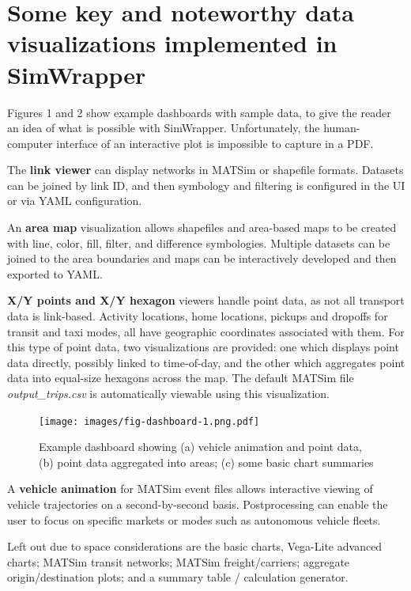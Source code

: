 \documentclass[3p,times,procedia]{elsarticle}
\begin{document}
\section{Some key and noteworthy data visualizations implemented in SimWrapper}

Figures 1 and 2 show example dashboards with sample data, to give the reader an idea of what is possible with SimWrapper. Unfortunately, the human-computer interface of an interactive plot is impossible to capture in a PDF.

The \textbf{link viewer} can display networks in MATSim or shapefile formats. Datasets can be joined by link ID, and then symbology and filtering is configured in the UI or via YAML configuration.

An \textbf{area map} visualization allows shapefiles and area-based maps to be created with line, color, fill, filter, and difference symbologies. Multiple datasets can be joined to the area boundaries and maps can be interactively developed and then exported to YAML.

\textbf{X/Y points and X/Y hexagon} viewers handle point data, as not all transport data is link-based. Activity locations, home locations, pickups and dropoffs for transit and taxi modes, all have geographic coordinates associated with them. For this type of point data, two visualizations are provided: one which displays point data directly, possibly linked to time-of-day, and the other which aggregates point data into equal-size hexagons across the map. The default MATSim file \textit{output\_trips.csv} is automatically viewable using this visualization.

\begin{figure}
  \centering
  \texttt{[image: images/fig-dashboard-1.png.pdf]}
  \caption{Example dashboard showing (a) vehicle animation and point data, (b) point data aggregated into areas; (c) some basic chart summaries}
  \label{fig:chart1}
\end{figure}

A \textbf{vehicle animation} for MATSim event files allows interactive viewing of vehicle trajectories on a second-by-second basis. Postprocessing can enable the user to focus on specific markets or modes such as autonomous vehicle fleets.

Left out due to space considerations are the basic charts, Vega-Lite\cite{VegaLiteWebsite}  advanced charts; MATSim transit networks; MATSim freight/carriers; aggregate origin/destination plots; and a summary table / calculation generator.
\end{document}
